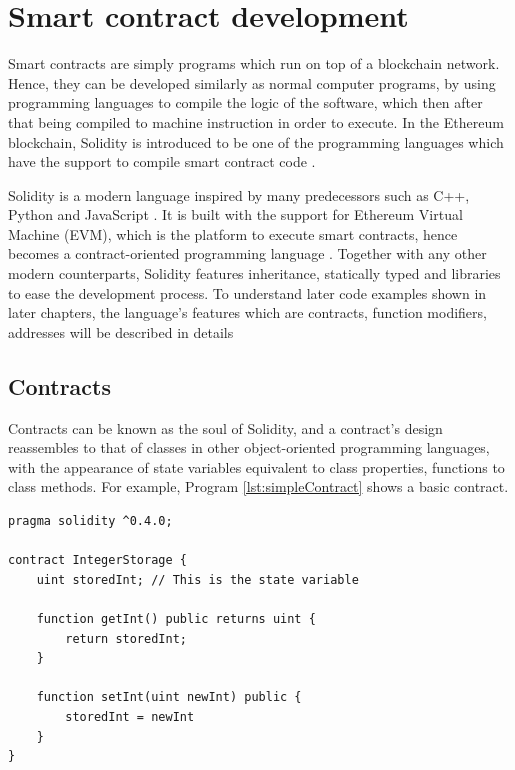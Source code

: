 \documentclass[twoside,numperchapter]{tutthesis} %
\begin{document}
\chapter{Smart contract development}
\label{ch:smartcontractdev}

Smart contracts are simply programs which run on top of a blockchain network. Hence, they can be developed similarly as normal computer programs, by using programming languages to compile the logic of the software, which then after that being compiled to machine instruction in order to execute. In the Ethereum blockchain, Solidity is introduced to be one of the programming languages which have the support to compile smart contract code \citep{SolidityDocumentation}. 

Solidity is a modern language inspired by many predecessors such as C++, Python and JavaScript \citep{SolidityDocumentation}. It is built with the support for Ethereum Virtual Machine (EVM), which is the platform to execute smart contracts, hence becomes a contract-oriented programming language \citep{SolidityDocumentation}. Together with any other modern counterparts, Solidity features inheritance, statically typed and libraries to ease the development process. To understand later code examples shown in later chapters, the language's features which are contracts, function modifiers, addresses will be described in details

\section{Contracts}

Contracts can be known as the soul of Solidity, and a contract's design reassembles to that of classes in other object-oriented programming languages, with the appearance of state variables equivalent to class properties, functions to class methods. For example, Program \ref{lst:simpleContract} shows a basic contract.

\begin{lstlisting}[float,caption={A simple contract in Solidity.},label={lst:simpleContract},language=Solidity]
pragma solidity ^0.4.0;

contract IntegerStorage {
    uint storedInt; // This is the state variable
    
    function getInt() public returns uint {
        return storedInt;
    }
    
    function setInt(uint newInt) public {
        storedInt = newInt
    }
}
\end{lstlisting}
\label{lst:simpleContract}
\end{document}
